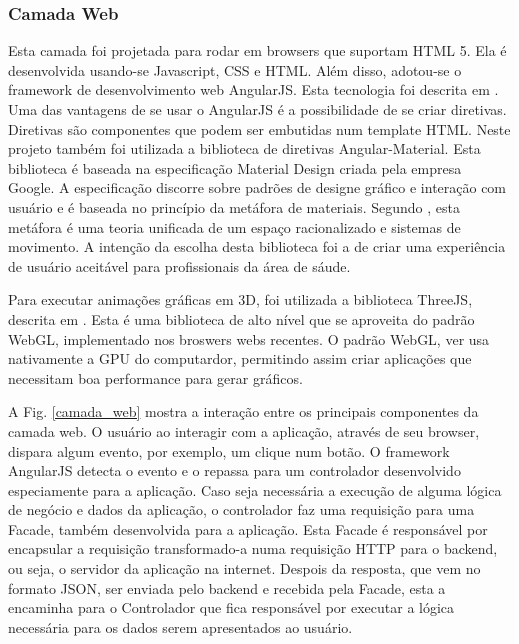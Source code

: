 \documentclass[journal]{IEEEtran}
\begin{document}
\subsubsection{Camada Web}
Esta camada foi projetada para rodar em browsers que suportam HTML 5. Ela é 
desenvolvida usando-se Javascript, CSS e HTML. Além disso, adotou-se o framework de
desenvolvimento web AngularJS. Esta tecnologia foi descrita em \cite{Branas2014}.
Uma das vantagens de se usar o AngularJS é a possibilidade de se criar diretivas.
Diretivas são componentes que podem ser embutidas num template HTML.
Neste projeto também foi utilizada a biblioteca de diretivas Angular-Material.
Esta biblioteca é baseada na especificação Material Design criada pela empresa Google. 
A especificação discorre sobre padrões de designe gráfico e interação com usuário e é baseada 
no princípio da metáfora de materiais. 
Segundo \cite{Google2015a}, esta metáfora é uma teoria unificada de um espaço racionalizado
e sistemas de movimento. A intenção da escolha desta biblioteca foi a de criar
uma experiência de usuário aceitável para profissionais da área de sáude.

Para executar animações gráficas em 3D, foi utilizada a biblioteca ThreeJS, descrita em \cite{Dirksen2015}.
Esta é uma biblioteca de alto nível que se aproveita do padrão WebGL, implementado
nos broswers webs recentes. O padrão WebGL, ver \cite{Matsuda2013} usa nativamente a GPU do computardor, 
permitindo assim criar aplicações que necessitam boa performance para gerar
gráficos. 

A Fig. \ref{camada_web} mostra a interação entre os principais componentes da camada web.
O usuário ao interagir com a aplicação, através de seu browser, dispara algum evento, 
por exemplo, um clique num botão. O framework AngularJS detecta o evento e o repassa
para um controlador desenvolvido especiamente para a aplicação. Caso seja necessária 
a execução de alguma lógica de negócio e dados da aplicação, o controlador faz uma
requisição para uma Facade, também desenvolvida para a aplicação. Esta Facade é responsável
por encapsular a requisição transformado-a numa requisição HTTP para o backend, ou seja, 
o servidor da aplicação na internet. Despois da resposta, que vem no formato JSON, ser
enviada pelo backend e recebida pela Facade, esta a encaminha para o Controlador que
fica responsável por executar a lógica necessária para os dados serem apresentados ao 
usuário.
\end{document}
